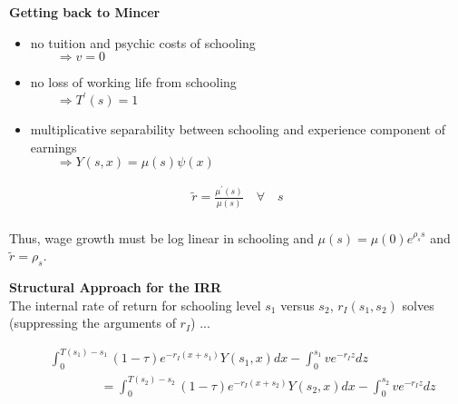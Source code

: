 \begin{frame}\textbf{Getting back to Mincer}\vspace{0.3cm}
\begin{itemize}\setlength\itemsep{1em}
\item no tuition and psychic costs of schooling \\
    $\qquad\Rightarrow v = 0$
\item no loss of working life from schooling \\
    $\qquad\Rightarrow T^\prime(s) = 1$
\item multiplicative separability between schooling and experience component of earnings \\
    $\qquad\Rightarrow Y(s, x) = \mu(s)\psi(x)$
\end{itemize}
\end{frame}
\begin{frame}
\begin{align*}
\tilde{r} = \frac{\mu^\prime(s)}{\mu(s)}\quad\forall\quad s\\
\end{align*}

Thus, wage growth must be log linear in schooling and $\mu(s) = \mu(0)e^{\rho_s s}$ and $\tilde{r} = \rho_s$.

\end{frame}
\begin{frame}\textbf{Structural Approach for the IRR}\vspace{0.3cm}\\

The internal rate of return for schooling level $s_1$ versus $s_2$, $r_I(s_1, s_2)$ solves (suppressing the arguments of $r_I$) ...

\begin{align*}
&\int_{0}^{T(s_1) - s_1} (1 - \tau)e^{-r_I(x + s_1)}Y(s_1, x) dx  - \int_{0}^{s_1} v e^{-r_I z} dz\\
&\qquad\qquad =  \int_{0}^{T(s_2) - s_2} (1 - \tau)e^{-r_I(x + s_2)}Y(s_2, x) dx - \int_{0}^{s_2} v e^{-r_I z} dz
\end{align*}

\end{frame}
